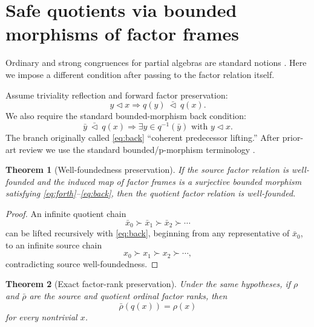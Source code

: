 \documentclass[11pt]{article}
\newtheorem{theorem}{Theorem}[section]
\theoremstyle{definition}
\theoremstyle{remark}
\begin{document}
\section{Safe quotients via bounded morphisms of factor frames}

Ordinary and strong congruences for partial algebras are standard notions \cite{Gratzer1979,GratzerWenzel1967}. Here we impose a different condition after passing to the factor relation itself.

Assume triviality reflection and forward factor preservation:
\begin{equation}
y\triangleleft x\Longrightarrow q(y)\ \bar\triangleleft\ q(x).
\label{eq:forth}
\end{equation}
We also require the standard bounded-morphism back condition:
\begin{equation}
\boxed{
\bar y\ \bar\triangleleft\ q(x)
\Longrightarrow
\exists y\in q^{-1}(\bar y)\text{ with }y\triangleleft x.}
\label{eq:back}
\end{equation}
The branch originally called \eqref{eq:back} ``coherent predecessor lifting.'' After prior-art review we use the standard bounded/p-morphism terminology \cite{BlackburnDeRijkeVenema2001}.

\begin{theorem}[Well-foundedness preservation]
If the source factor relation is well-founded and the induced map of factor frames is a surjective bounded morphism satisfying \eqref{eq:forth}--\eqref{eq:back}, then the quotient factor relation is well-founded.
\end{theorem}

\begin{proof}
An infinite quotient chain
\[
\bar x_0\succ\bar x_1\succ\bar x_2\succ\cdots
\]
can be lifted recursively with \eqref{eq:back}, beginning from any representative of \(\bar x_0\), to an infinite source chain
\[
x_0\succ x_1\succ x_2\succ\cdots,
\]
contradicting source well-foundedness.
\end{proof}

\begin{theorem}[Exact factor-rank preservation]
Under the same hypotheses, if \(\rho\) and \(\bar\rho\) are the source and quotient ordinal factor ranks, then
\begin{equation}
\boxed{\bar\rho(q(x))=\rho(x)}
\label{eq:rankpreserve}
\end{equation}
for every nontrivial \(x\).
\end{theorem}
\end{document}
